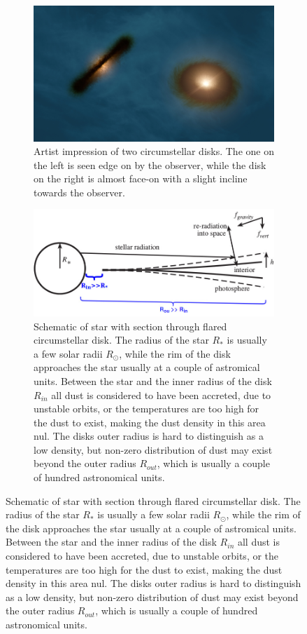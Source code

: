 \begin{figure}[h!]
	\begin{subfigure}[t]{0.9\textwidth}
	\includegraphics[width=\textwidth]{img/circumstellar-disk-eso1423a}
	\caption{Artist impression of two circumstellar disks. The one on the left is seen edge on by the observer, while the disk on the right is almost face-on with a slight incline towards the observer. }
	\label{fig:disk-artist-impression}
	\end{subfigure}\par\bigskip
	\begin{subfigure}[t]{0.9\textwidth}
	\includegraphics[width=\textwidth]{img/flare}
	\caption{Schematic of star with section through flared circumstellar disk. The radius of the star $R_{*}$ is usually a few solar radii $R_{\odot}$, while the rim of the disk approaches the star usually at a couple of astromical units. Between the star and the inner radius of the disk $R_{in}$ all dust is considered to have been accreted, due to unstable orbits, or the temperatures are too high for the dust to exist, making the dust density in this area nul. The disks outer radius is hard to distinguish as a low density, but non-zero distribution of dust may exist beyond the outer radius $R_{out}$, which is usually a couple of hundred astronomical units.}
	\label{fig:flare}
	\end{subfigure}
\end{figure}

